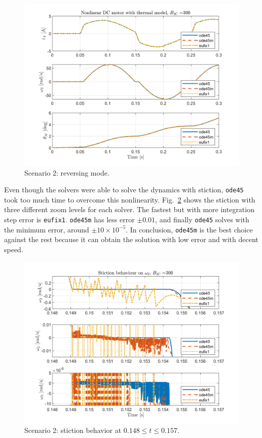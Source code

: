 \documentclass[]{article}
\newcommand{\figref}[1]{Fig.~\ref{#1}}
\begin{document}
\begin{figure}[H]
	\centering
	\includegraphics[width=0.8\linewidth]{sinE0_ode45-ode45m-eufix1_1e-4}
	\caption{Scenario 2: reversing mode.}
	\label{fig:Sce2}
\end{figure}

Even though the solvers were able to solve the dynamics with stiction, \texttt{ode45} took too much time to overcome this nonlinearity. \figref{fig:Sce2_zoom} shows the stiction with three different zoom levels for each solver. The fastest but with more integration step error is \texttt{eufix1}. \texttt{ode45m} has less error $\pm 0.01$, and finally \texttt{ode45} solves with the minimum error, around $\pm 10\times 10^{-5}$. In conclusion, \texttt{ode45m} is the best choice against the rest because it can obtain the solution with low error and with decent speed.

\begin{figure}[H]
	\centering
	\includegraphics[width=1\linewidth]{sinE0_ode45-ode45m-eufix1_1e-4_zoom}
	\caption{Scenario 2: stiction behavior at $0.148\leq t \leq 0.157$.}
	\label{fig:Sce2_zoom}
\end{figure}
\end{document}
